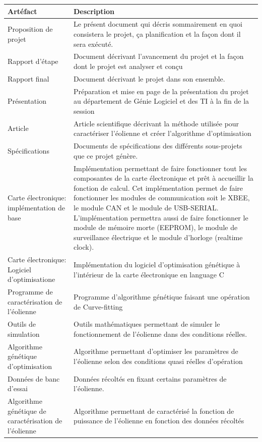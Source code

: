 \documentclass[11pt]{article}
\begin{document}
\begin{longtabu} to \linewidth {X[1,l]X[2,l]}
  Artéfact & Description \\ \hline
  Proposition de projet & Le présent document qui décris sommairement en quoi consistera le projet, ça planification et la façon dont il sera exécuté.\\ \hline
  Rapport d'étape & Document décrivant l'avancement du projet et la façon dont le projet est analyser et conçu \\ \hline
  Rapport final & Document décrivant le projet dans son ensemble.\\ \hline
  Présentation & Préparation et mise en page de la présentation du projet au département de Génie Logiciel et des TI à la fin de la session\\ \hline
  Article & Article scientifique décrivant la méthode utilisée pour caractériser l'éolienne et créer l'algorithme d'optimisation\\ \hline
  Spécifications & Documents de spécifications des différents sous-projets que ce projet génère.\\ \hline
  Carte électronique: implémentation de base & Implémentation permettant de faire fonctionner tout les composantes de la carte électronique et prêt à accueillir la fonction de calcul. Cet implémentation permet de faire fonctionner les modules de communication soit le XBEE, le module CAN et le module de USB-SERIAL. L'implémentation permettra aussi de faire fonctionner le module de mémoire morte (EEPROM), le module de surveillance électrique et le module d'horloge (realtime clock).\\ \hline
  Carte électronique: Logiciel d'optimisatione & Implémentation du logiciel d'optimisation génétique à l'intérieur de la carte électronique en language C\\ \hline
  Programme de caractérisation de l'éolienne & Programme d'algorithme génétique faisant une opération de Curve-fitting \\ \hline
  Outils de simulation & Outils mathématiques permettant de simuler le fonctionnement de l'éolienne dans des conditions réelles. \\ \hline
  Algorithme génétique d'optimisation & Algorithme permettant d'optimiser les paramètres de l'éolienne selon des conditions quasi réelles d'opération \\ \hline
  Données de banc d'essai & Données récoltés en fixant certains paramètres de l'éolienne. \\ \hline
  Algorithme génétique de caractérisation de l'éolienne & Algorithme permettant de caractérisé la fonction de puissance de l'éolienne en fonction des données récoltés \\ \hline 

\end{longtabu}
\end{document}
